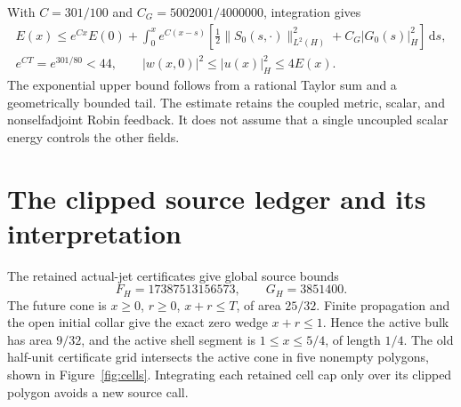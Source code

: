 \documentclass[11pt]{article}
\newcommand{\dd}{\,\mathrm d}
\newcommand{\norm}[1]{\lvert #1\rvert_H}
\begin{document}
With $C=301/100$ and $C_G=5002001/4000000$, integration gives
\begin{equation}
\begin{aligned}
 E(x)\le e^{Cx}E(0)+\int_0^x e^{C(x-s)}
 \left[\frac12\|S_0(s,\cdot)\|_{L^2(H)}^2
                  +C_G\norm{G_0(s)}^2\right]\dd s,\\
 e^{CT}=e^{301/80}<44,\qquad
 |w(x,0)|^2\le\norm{u(x)}^2\le4E(x).
\end{aligned}
\label{eq:convolution}
\end{equation}
The exponential upper bound follows from a rational Taylor sum and a
geometrically bounded tail. The estimate retains the coupled metric,
scalar, and nonselfadjoint Robin feedback. It does not assume that a
single uncoupled scalar energy controls the other fields.

\section{The clipped source ledger and its interpretation}
\label{sec:ledger}
The retained actual-jet certificates give global source bounds
\begin{equation}
 F_H=17387513156573,\qquad G_H=3851400.
 \label{eq:globalcaps}
\end{equation}
The future cone is $x\ge0$, $r\ge0$, $x+r\le T$, of area $25/32$.
Finite propagation and the open initial collar give the exact zero wedge
$x+r\le1$. Hence the active bulk has area $9/32$, and the active shell
segment is $1\le x\le5/4$, of length $1/4$.
The old half-unit certificate grid intersects the active cone in five
nonempty polygons, shown in Figure~\ref{fig:cells}. Integrating each
retained cell cap only over its clipped polygon avoids a new source call.
\end{document}

